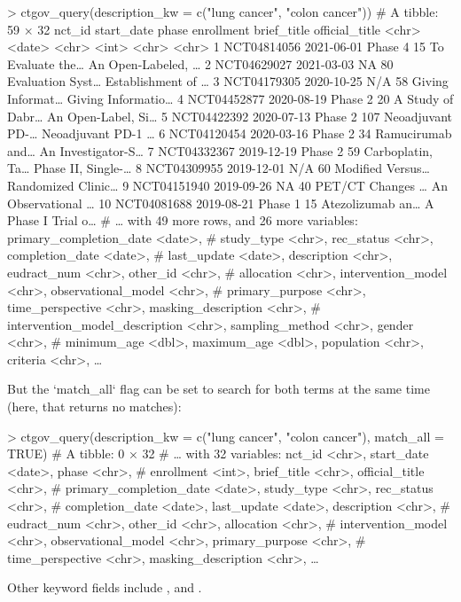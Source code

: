 \begin{example}
> ctgov_query(description_kw = c("lung cancer", "colon cancer"))
# A tibble: 59 × 32
   nct_id      start_date phase   enrollment brief_title      official_title
   <chr>       <date>     <chr>        <int> <chr>            <chr>
 1 NCT04814056 2021-06-01 Phase 4         15 To Evaluate the… An Open-Labeled, …
 2 NCT04629027 2021-03-03 NA              80 Evaluation Syst… Establishment of …
 3 NCT04179305 2020-10-25 N/A             58 Giving Informat… Giving Informatio…
 4 NCT04452877 2020-08-19 Phase 2         20 A Study of Dabr… An Open-Label, Si…
 5 NCT04422392 2020-07-13 Phase 2        107 Neoadjuvant PD-… Neoadjuvant PD-1 …
 6 NCT04120454 2020-03-16 Phase 2         34 Ramucirumab and… An Investigator-S…
 7 NCT04332367 2019-12-19 Phase 2         59 Carboplatin, Ta… Phase II, Single-…
 8 NCT04309955 2019-12-01 N/A             60 Modified Versus… Randomized Clinic…
 9 NCT04151940 2019-09-26 NA              40 PET/CT Changes … An Observational …
10 NCT04081688 2019-08-21 Phase 1         15 Atezolizumab an… A Phase I Trial o…
# … with 49 more rows, and 26 more variables: primary_completion_date <date>,
#   study_type <chr>, rec_status <chr>, completion_date <date>,
#   last_update <date>, description <chr>, eudract_num <chr>, other_id <chr>,
#   allocation <chr>, intervention_model <chr>, observational_model <chr>,
#   primary_purpose <chr>, time_perspective <chr>, masking_description <chr>,
#   intervention_model_description <chr>, sampling_method <chr>, gender <chr>,
#   minimum_age <dbl>, maximum_age <dbl>, population <chr>, criteria <chr>, …
\end{example}

But the `match\_all` flag can be set to search for both terms at the same time
(here, that returns no matches):

\begin{example}
> ctgov_query(description_kw = c("lung cancer", "colon cancer"), match_all = TRUE)
# A tibble: 0 × 32
# … with 32 variables: nct_id <chr>, start_date <date>, phase <chr>,
#   enrollment <int>, brief_title <chr>, official_title <chr>,
#   primary_completion_date <date>, study_type <chr>, rec_status <chr>,
#   completion_date <date>, last_update <date>, description <chr>,
#   eudract_num <chr>, other_id <chr>, allocation <chr>,
#   intervention_model <chr>, observational_model <chr>, primary_purpose <chr>,
#   time_perspective <chr>, masking_description <chr>, …
\end{example}

Other keyword fields include ,
 and .


